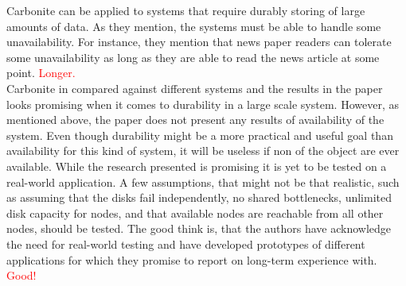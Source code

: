 \documentclass{article}
\begin{document}
\noindent Carbonite can be applied to systems that require durably storing of large amounts of data. As they mention, the systems must be able to handle some unavailability. For instance, they mention that news paper readers can tolerate some unavailability as long as they are able to read the news article at some point. \textcolor{red}{Longer.}\\

\noindent Carbonite in compared against different systems and the results in the paper looks promising when it comes to durability in a large scale system. However, as mentioned above, the paper does not present any results of availability of the system. Even though durability might be a more practical and useful goal than availability for this kind of system, it will be useless if non of the object are ever available. While the research presented is promising it is yet to be tested on a real-world application. A few assumptions, that might not be that realistic, such as assuming that the disks fail independently, no shared bottlenecks, unlimited disk capacity for nodes, and that available nodes are reachable from all other nodes, should be tested. The good think is, that the authors have acknowledge the need for real-world testing and have developed prototypes of different applications for which they promise to report on long-term experience with. \textcolor{red}{Good!}\\
\end{document}
